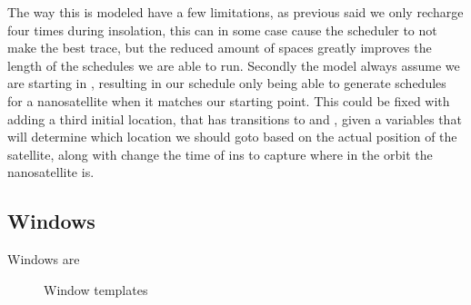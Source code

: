 The way this is modeled have a few limitations, as previous said we only recharge four times during insolation, this can in some case cause the scheduler to not make the best trace, but the reduced amount of spaces greatly improves the length of the schedules we are able to run. Secondly the model always assume we are starting in , resulting in our schedule only being able to generate schedules for a nanosatellite when it matches our starting point. This could be fixed with adding a third initial location, that has transitions to  and , given a variables that will determine which location we should goto based on the actual position of the satellite, along with change the time of ins to capture where in the orbit the nanosatellite is. 


\subsection*{Windows}
Windows are 

\begin{figure}[H]
	\centering
	\caption{Window templates}
	\label{fig:cora_inso}
\end{figure}

